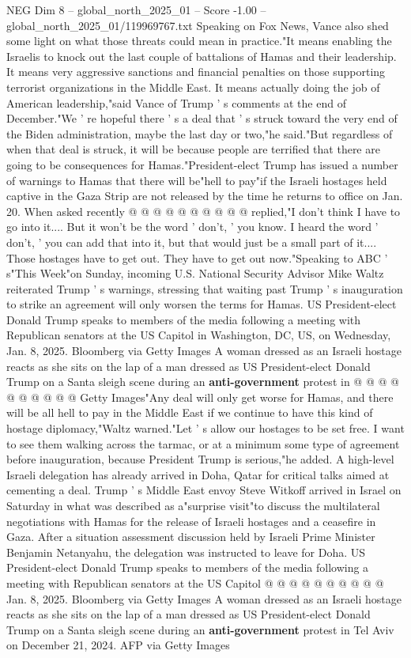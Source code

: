 \begin{textsample}{NEG Dim 8 – global\_north\_2025\_01 – Score -1.00 – global\_north\_2025\_01/119969767.txt}  \label{ex:f8_neg_340}
Speaking on Fox News, Vance also shed some light on what those threats could mean in practice."It means enabling the Israelis to knock out the last couple of battalions of Hamas and their leadership.
It means very aggressive sanctions and financial penalties on those supporting terrorist organizations in the Middle East.
It means actually doing the job of American leadership,"said Vance of Trump ' s comments at the end of December."We ' re hopeful there ' s a deal that ' s struck toward the very end of the Biden administration, maybe the last day or two,"he said."But regardless of when that deal is struck, it will be because people are terrified that there are going to be consequences for Hamas."President-elect Trump has issued a number of warnings to Hamas that there will be"hell to pay"if the Israeli hostages held captive in the Gaza Strip are not released by the time he returns to office on Jan. 20.
When asked recently @ @ @ @ @ @ @ @ @ @ replied,"I don't think I have to go into it....
But it won't be the word ' don't, ' you know.
I heard the word ' don't, ' you can add that into it, but that would just be a small part of it....
Those hostages have to get out.
They have to get out now."Speaking to ABC ' s"This Week"on Sunday, incoming U.S.
National Security Advisor Mike Waltz reiterated Trump ' s warnings, stressing that waiting past Trump ' s inauguration to strike an agreement will only worsen the terms for Hamas.
US President-elect Donald Trump speaks to members of the media following a meeting with Republican senators at the US Capitol in Washington, DC, US, on Wednesday, Jan. 8, 2025.
Bloomberg via Getty Images A woman dressed as an Israeli hostage reacts as she sits on the lap of a man dressed as US President-elect Donald Trump on a Santa sleigh scene during an \textbf{anti-government} protest in @ @ @ @ @ @ @ @ @ @ Getty Images"Any deal will only get worse for Hamas, and there will be all hell to pay in the Middle East if we continue to have this kind of hostage diplomacy,"Waltz warned."Let ' s allow our hostages to be set free.
I want to see them walking across the tarmac, or at a minimum some type of agreement before inauguration, because President Trump is serious,"he added.
A high-level Israeli delegation has already arrived in Doha, Qatar for critical talks aimed at cementing a deal.
Trump ' s Middle East envoy Steve Witkoff arrived in Israel on Saturday in what was described as a"surprise visit"to discuss the multilateral negotiations with Hamas for the release of Israeli hostages and a ceasefire in Gaza.
After a situation assessment discussion held by Israeli Prime Minister Benjamin Netanyahu, the delegation was instructed to leave for Doha.
US President-elect Donald Trump speaks to members of the media following a meeting with Republican senators at the US Capitol @ @ @ @ @ @ @ @ @ @ Jan. 8, 2025.
Bloomberg via Getty Images A woman dressed as an Israeli hostage reacts as she sits on the lap of a man dressed as US President-elect Donald Trump on a Santa sleigh scene during an \textbf{anti-government} protest in Tel Aviv on December 21, 2024.
AFP via Getty Images

\end{textsample}
